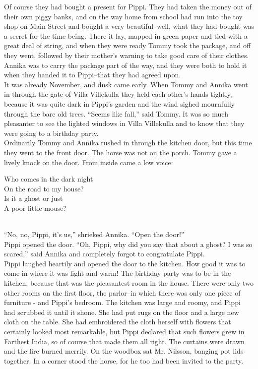 \documentclass{standard}
\begin{document}
Of course they had bought a present for Pippi. They had taken the money out of their own piggy banks, and on the way home from school had run into the toy shop on Main Street and bought a very beautiful--well, what they had bought was a secret for the time being. There it lay, mapped in green paper and tied with a great deal of string, and when they were ready Tommy took the package, and off they went, followed by their mother’s warning to take good care of their clothes. Annika was to carry the package part of the way, and they were both to hold it when they handed it to Pippi--that they had agreed upon.\\

It was already November, and dusk came early. When Tommy and Annika went in through the gate of Villa Villekulla they held each other’s hands tightly, because it was quite dark in Pippi’s garden and the wind sighed mournfully through the bare old trees. “Seems like fall,” said Tommy. It was so much pleasanter to see the lighted windows in Villa Villekulla and to know that they were going to a birthday party.\\

Ordinarily Tommy and Annika rushed in through the kitchen door, but this time they went to the front door. The horse was not on the porch. Tommy gave a lively knock on the door.
From inside came a low voice:\\

\begin{center}
Who comes in the dark night\\
On the road to my house?\\
Is it a ghost or just\\
A poor little mouse?
\end{center}
\noindent \\

“No, no, Pippi, it’s us,” shrieked Annika. “Open the door!”\\

Pippi opened the door. “Oh, Pippi, why did you say that about a ghost? I was so scared,” said Annika and completely forgot to congratulate Pippi.\\

Pippi laughed heartily and opened the door to the kitchen. How good it was to come in where it was light and warm! The birthday party was to be in the kitchen, because that was the pleasantest room in the house. There were only two other rooms on the first floor, the parlor--in which there was only one piece of furniture - and Pippi’s bedroom. The kitchen was large and roomy, and Pippi had scrubbed it until it shone. She had put rugs on the floor and a large new cloth on the table. She had embroidered the cloth herself with flowers that certainly looked most remarkable, but Pippi declared that such flowers grew in Farthest India, so of course that made them all right. The curtains were drawn and the fire burned merrily. On the woodbox sat Mr. Nilsson, banging pot lids together. In a corner stood the horse, for he too had been invited to the party.\\
\end{document}

